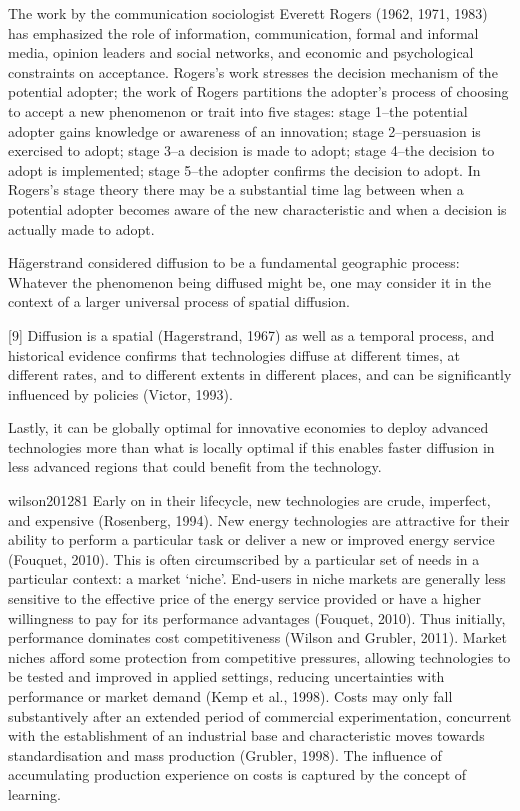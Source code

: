 \documentclass[10pt,letterpaper]{article}
\begin{document}
The work by the communication sociologist Everett Rogers (1962, 1971,
1983) has emphasized the role of information, communication, formal and
informal media, opinion leaders and social networks, and economic and
psychological constraints on acceptance. Rogers's work stresses the
decision mechanism of the potential adopter; the work of Rogers
partitions the adopter's process of choosing to accept a new phenomenon
or trait into five stages: stage 1--the potential adopter gains
knowledge or awareness of an innovation; stage 2--persuasion is
exercised to adopt; stage 3--a decision is made to adopt; stage 4--the
decision to adopt is implemented; stage 5--the adopter confirms the
decision to adopt. In Rogers's stage theory there may be a substantial
time lag between when a potential adopter becomes aware of the new
characteristic and when a decision is actually made to adopt.

Hägerstrand considered diffusion to be a fundamental geographic process:
Whatever the phenomenon being diffused might be, one may consider it in
the context of a larger universal process of spatial diffusion.

{[}9{]} Diffusion is a spatial (Hagerstrand, 1967) as well as a temporal
process, and historical evidence confirms that technologies diffuse at
different times, at different rates, and to different extents in
different places, and can be significantly influenced by policies
(Victor, 1993).

Lastly, it can be globally optimal for innovative economies to deploy
advanced technologies more than what is locally optimal if this enables
faster diffusion in less advanced regions that could benefit from the
technology.

wilson201281 Early on in their lifecycle, new technologies are crude,
imperfect, and expensive (Rosenberg, 1994). New energy technologies are
attractive for their ability to perform a particular task or deliver a
new or improved energy service (Fouquet, 2010). This is often
circumscribed by a particular set of needs in a particular context: a
market `niche'. End-users in niche markets are generally less sensitive
to the effective price of the energy service provided or have a higher
willingness to pay for its performance advantages (Fouquet, 2010). Thus
initially, performance dominates cost competitiveness (Wilson and
Grubler, 2011). Market niches afford some protection from competitive
pressures, allowing technologies to be tested and improved in applied
settings, reducing uncertainties with performance or market demand (Kemp
et al., 1998). Costs may only fall substantively after an extended
period of commercial experimentation, concurrent with the establishment
of an industrial base and characteristic moves towards standardisation
and mass production (Grubler, 1998). The influence of accumulating
production experience on costs is captured by the concept of learning.
\end{document}

